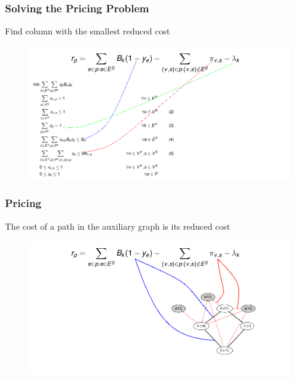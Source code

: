 \documentclass[english]{beamer}
\begin{document}
\begin{frame}
\frametitle{Solving the Pricing Problem}
  Find column with the smallest reduced cost

  \begin{figure}
    \centering
    \includegraphics[scale=0.4]{redcost1.png}
  \end{figure}

\end{frame}
\begin{frame}
\frametitle{Pricing}
  The cost of a path in the auxiliary graph is its reduced cost

  \begin{figure}
    \centering
    \includegraphics[scale=0.4]{redcost2.png}
  \end{figure}

\end{frame}
\end{document}
